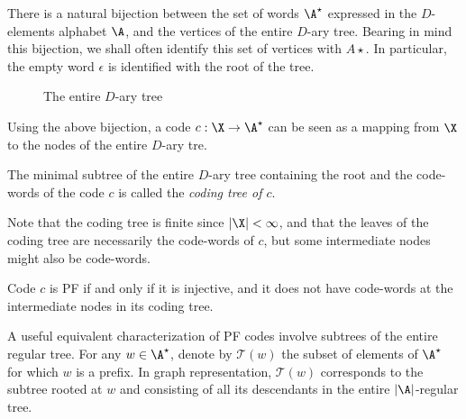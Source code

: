 \documentclass[toc]{../cs-classes/cs-classes}
\begin{document}
\begin{remark}
    There is a natural bijection between the set of words $\A^\star$ expressed in the $D$-elements alphabet $\A$, and the vertices of the entire $D$-ary tree. Bearing in mind this bijection, we shall often identify this set of vertices with $A\star$. In particular, the empty word $\epsilon$ is identified with the root of the tree.
    
    \begin{figure}[!ht]
        \center
        \caption{The entire $D$-ary tree}
    \end{figure}

    Using the above bijection, a code $c:\X\to\A^\star$ can be seen as a mapping from $\X$ to the nodes of the entire $D$-ary tre.
\end{remark}

\begin{definition}
    The minimal subtree of the entire $D$-ary tree containing the root and the code-words of the code $c$ is called the \emph{coding tree of $c$}.

    Note that the coding tree is finite since $|\X|<\infty$, and that the leaves of the coding tree are necessarily the code-words of $c$, but some intermediate nodes might also be code-words.
\end{definition}

\begin{lemma}
    \label{lem:pf-coding-trees}
    Code $c$ is PF if and only if it is injective, and it does not have code-words at the intermediate nodes in its coding tree.
\end{lemma}

A useful equivalent characterization of PF codes involve subtrees of the entire regular tree. For any $w\in\A^\star$, denote by $\mathcal{T}(w)$ the subset of elements of $\A^\star$ for which $w$ is a prefix. In graph representation, $\mathcal{T}(w)$ corresponds to the subtree rooted at $w$ and consisting of all its descendants in the entire $|\A|$-regular tree.
\end{document}
